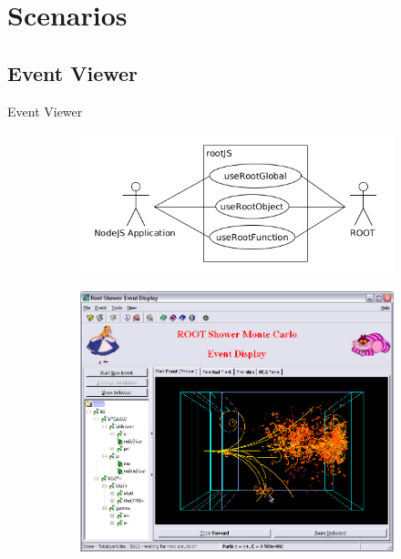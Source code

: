 \section{Scenarios}
\subsection{Event Viewer}
\begin{frame}{Event Viewer}

  \begin{figure}[htb]
    \centering
    \begin{subfigure}[b]{0.5\textwidth}
      \includegraphics[width=0.97\linewidth, keepaspectratio]{./resources/usecaseOverview.png}
    \end{subfigure}%
    \begin{subfigure}[b]{0.5\textwidth}
      \includegraphics[width=0.97\linewidth, keepaspectratio]{./resources/shower_event_viewer.png}
      \nocite{cern:root:eventviewer}
    \end{subfigure}
  \end{figure}
\end{frame}
